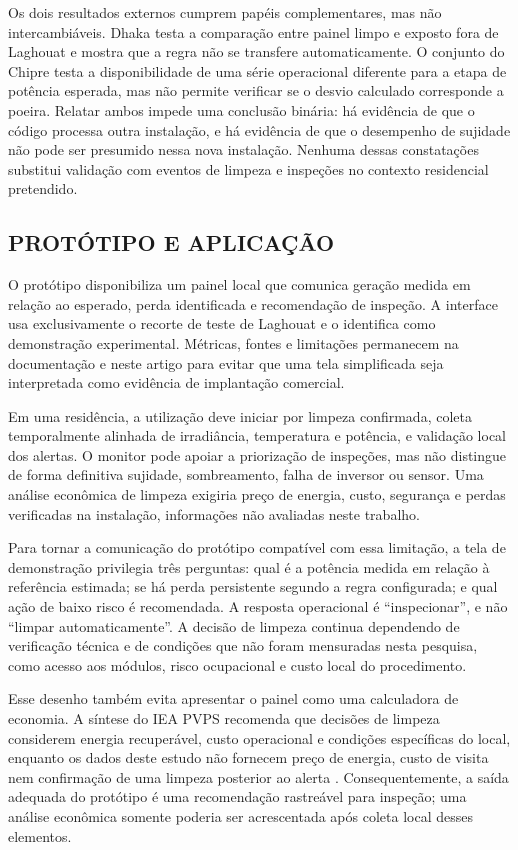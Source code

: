\documentclass{UNESC}
\begin{document}
Os dois resultados externos cumprem papéis complementares, mas não intercambiáveis. Dhaka testa a comparação entre painel limpo e exposto fora de Laghouat e mostra que a regra não se transfere automaticamente. O conjunto do Chipre testa a disponibilidade de uma série operacional diferente para a etapa de potência esperada, mas não permite verificar se o desvio calculado corresponde a poeira. Relatar ambos impede uma conclusão binária: há evidência de que o código processa outra instalação, e há evidência de que o desempenho de sujidade não pode ser presumido nessa nova instalação. Nenhuma dessas constatações substitui validação com eventos de limpeza e inspeções no contexto residencial pretendido.

\subsection{PROTÓTIPO E APLICAÇÃO}

O protótipo disponibiliza um painel local que comunica geração medida em relação ao esperado, perda identificada e recomendação de inspeção. A interface usa exclusivamente o recorte de teste de Laghouat e o identifica como demonstração experimental. Métricas, fontes e limitações permanecem na documentação e neste artigo para evitar que uma tela simplificada seja interpretada como evidência de implantação comercial.

Em uma residência, a utilização deve iniciar por limpeza confirmada, coleta temporalmente alinhada de irradiância, temperatura e potência, e validação local dos alertas. O monitor pode apoiar a priorização de inspeções, mas não distingue de forma definitiva sujidade, sombreamento, falha de inversor ou sensor. Uma análise econômica de limpeza exigiria preço de energia, custo, segurança e perdas verificadas na instalação, informações não avaliadas neste trabalho.

Para tornar a comunicação do protótipo compatível com essa limitação, a tela de demonstração privilegia três perguntas: qual é a potência medida em relação à referência estimada; se há perda persistente segundo a regra configurada; e qual ação de baixo risco é recomendada. A resposta operacional é ``inspecionar'', e não ``limpar automaticamente''. A decisão de limpeza continua dependendo de verificação técnica e de condições que não foram mensuradas nesta pesquisa, como acesso aos módulos, risco ocupacional e custo local do procedimento.

Esse desenho também evita apresentar o painel como uma calculadora de economia. A síntese do IEA PVPS recomenda que decisões de limpeza considerem energia recuperável, custo operacional e condições específicas do local, enquanto os dados deste estudo não fornecem preço de energia, custo de visita nem confirmação de uma limpeza posterior ao alerta \cite{ieapvps2025soiling}. Consequentemente, a saída adequada do protótipo é uma recomendação rastreável para inspeção; uma análise econômica somente poderia ser acrescentada após coleta local desses elementos.
\end{document}
